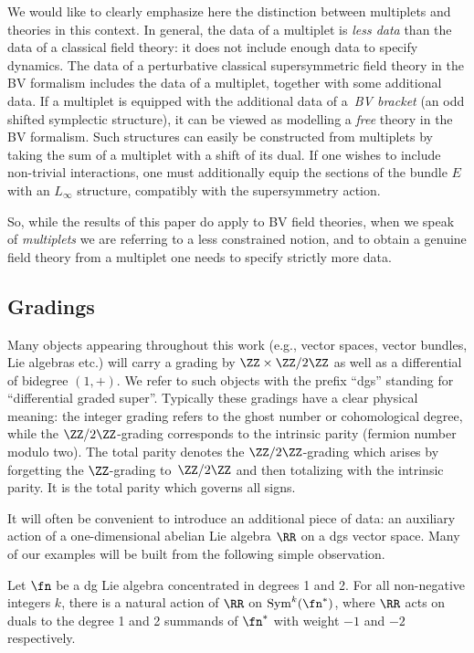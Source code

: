 \documentclass[10pt,a4paper]{amsart}
\numberwithin{equation}{section}
\DeclareMathOperator{\Sym}{Sym}
\begin{document}
\begin{rmk}
	We would like to clearly emphasize here the distinction between multiplets and theories in this context. In general, the data of a multiplet is \emph{less data} than the data of a classical field theory: it does not include enough data to specify dynamics. The data of a perturbative classical supersymmetric field theory in the BV formalism includes the data of a multiplet, together with some additional data. If a multiplet is equipped with the additional data of a~\emph{BV bracket} (an odd shifted symplectic structure), it can be viewed as modelling a \emph{free} theory in the BV formalism. Such structures can easily be constructed from multiplets by taking the sum of a multiplet with a shift of its dual.	If one wishes to include non-trivial interactions, one must additionally equip the sections of the bundle $E$ with an $L_\infty$ structure, compatibly with the supersymmetry action.
	
	So, while the results of this paper do apply to BV field theories, when we speak of \emph{multiplets} we are referring to a less constrained notion, and to obtain a genuine field theory from a multiplet one needs to specify strictly more data.
\end{rmk}

\subsection{Gradings}
\label{ssec:gradings}
Many objects appearing throughout this work (e.g., vector spaces, vector bundles, Lie algebras etc.) will carry a grading by $\ZZ\times \ZZ/2\ZZ$ as well as a differential of bidegree $(1,+)$. We refer to such objects with the prefix ``dgs'' standing for ``differential graded super''. Typically these gradings have a clear physical meaning: the integer grading refers to the ghost number or cohomological degree, while the $\ZZ/2\ZZ$-grading corresponds to the intrinsic parity (fermion number modulo two). The total parity denotes the $\ZZ/2\ZZ$-grading which arises by forgetting the $\ZZ$-grading to~$\ZZ/2\ZZ$ and then totalizing with the intrinsic parity. It is the total parity which governs all signs.

It will often be convenient to introduce an additional piece of data: an auxiliary action of a one-dimensional abelian Lie algebra $\RR$ on a dgs vector space. Many of our examples will be built from the following simple observation.

\begin{eg}
	Let $\fn$ be a dg Lie algebra concentrated in degrees 1 and 2. For all non-negative integers $k$, there is a natural action of $\RR$ on $\Sym^k(\fn^*)$, where $\RR$ acts on duals to the degree 1 and 2 summands of $\fn^*$ with weight $-1$ and $-2$ respectively.
\end{eg}
\end{document}
